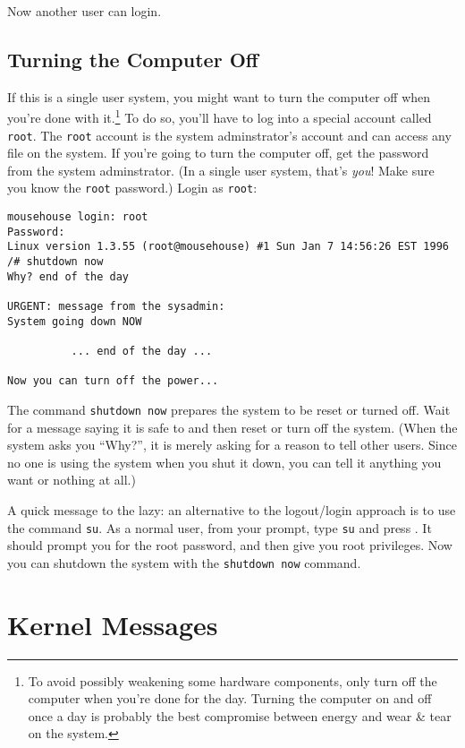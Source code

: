 Now another user can login.

\subsection{Turning the Computer Off}

If this is a single user system, you might want to turn the computer
off when you're done with it.\footnote{To avoid possibly weakening
  some hardware components, only turn off the computer when you're
  done for the day.  Turning the computer on and off once a day is
  probably the best compromise between energy and wear \& tear on the
  system.} To do so, you'll have to log into a special account called
{\tt root}. The {\tt root} account is the system adminstrator's
account and can access any file on the system.  If you're going to
turn the computer off, get the password from the system adminstrator.
(In a single user system, that's {\em you\/}!  Make sure you know the
{\tt root} password.) Login as {\tt root}:

\begin{screen}\begin{verbatim}
mousehouse login: root
Password:
Linux version 1.3.55 (root@mousehouse) #1 Sun Jan 7 14:56:26 EST 1996
/# shutdown now
Why? end of the day

URGENT: message from the sysadmin:
System going down NOW

          ... end of the day ...

Now you can turn off the power...
\end{verbatim}\end{screen}

The command {\tt shutdown now} prepares the system to be reset or
turned off.  Wait for a message saying it is safe to and then reset or
turn off the system.  (When the system asks you
``Why?'', it is merely asking for a reason to tell other users.  Since
no one is using the system when you shut it down, you can tell it
anything you want or nothing at all.)

A quick message to the lazy: an alternative to the logout/login
approach is to use the command {\tt su}. As a normal user, from your
prompt, type {\tt su} and press \ret. It should prompt you for the
root password, and then give you root privileges. Now you can shutdown
the system with the {\tt shutdown now} command.

\section{Kernel Messages}\label{kernel-messages}

